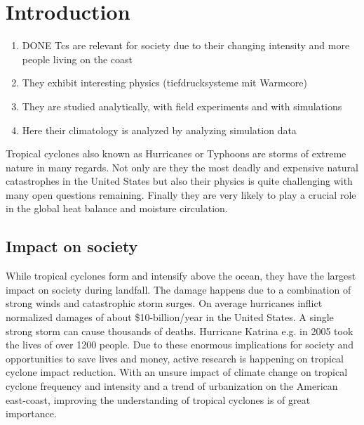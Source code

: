 \chapter{Introduction}\label{sec:introduction}
\begin{enumerate}
\item DONE Tcs are relevant for society due to their changing intensity and more people living on the coast
\item They exhibit interesting physics (tiefdrucksysteme mit Warmcore)
\item They are studied analytically, with field experiments and with simulations
\item Here their climatology is analyzed by analyzing simulation data
\end{enumerate}
Tropical cyclones also known as Hurricanes or Typhoons are storms of extreme nature in many regards. Not only are they the most deadly and expensive natural catastrophes in the United States but also their physics is quite challenging with many open questions remaining.\cite{emanuel-summ}
Finally they are very likely to play a crucial role in the global heat balance and moisture circulation.\cite{moisture-transport}\cite{global-heat}

\section{Impact on society}\label{sec:society}
While tropical cyclones form and intensify above the ocean, they have the largest impact on society during landfall. The damage happens due to a combination of strong winds and catastrophic storm surges. On average hurricanes inflict normalized damages of about \$10-billion/year in the United States.\cite{damage-norm} A single strong storm can cause thousands of deaths. Hurricane Katrina e.g. in 2005 took the lives of over 1200 people.\cite{hurr-2005}
Due to these enormous implications for society and opportunities to save lives and money, active research is happening on tropical cyclone impact reduction. With an unsure impact of climate change on tropical cyclone frequency and intensity and a trend of urbanization on the American east-coast, improving the understanding of tropical cyclones is of great importance.

